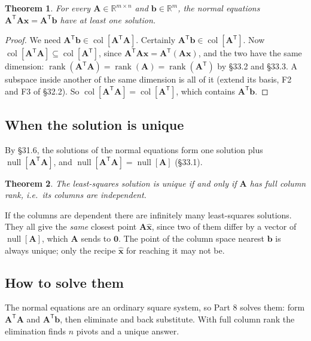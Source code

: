 \documentclass[11pt]{article}
\theoremstyle{plain}
\newtheorem{thm}{Theorem}[section]
\theoremstyle{definition}
\theoremstyle{remark}
\newcommand{\R}{\mathbb{R}}
\newcommand{\vc}[1]{\mathbf{#1}}
\newcommand{\mt}[1]{\mathbf{#1}}
\newcommand{\T}{^{\mathsf{T}}}
\newcommand{\colsp}[1]{\operatorname{col}[#1]}
\newcommand{\nullsp}[1]{\operatorname{null}[#1]}
\newcommand{\xh}{\hat{\vc{x}}}
\DeclareMathOperator{\rank}{rank}
\begin{document}
\begin{thm}
\label{thm:consistent}
For every $\mt{A}\in\R^{m\times n}$ and $\vc{b}\in\R^{m}$, the normal equations
$\mt{A}\T\mt{A}\vc{x}=\mt{A}\T\vc{b}$ have at least one solution.
\end{thm}

\begin{proof}
We need $\mt{A}\T\vc{b}\in\colsp{\mt{A}\T\mt{A}}$. Certainly
$\mt{A}\T\vc{b}\in\colsp{\mt{A}\T}$. Now
$\colsp{\mt{A}\T\mt{A}}\subseteq\colsp{\mt{A}\T}$, since
$\mt{A}\T\mt{A}\vc{x}=\mt{A}\T(\mt{A}\vc{x})$, and the two have the same
dimension: $\rank(\mt{A}\T\mt{A})=\rank(\mt{A})=\rank(\mt{A}\T)$ by \S33.2 and
\S33.3. A subspace inside another of the same dimension is all of it (extend its
basis, F2 and F3 of \S32.2). So $\colsp{\mt{A}\T\mt{A}}=\colsp{\mt{A}\T}$, which
contains $\mt{A}\T\vc{b}$.
\end{proof}

\subsection{When the solution is unique}
By \S31.6, the solutions of the normal equations form one solution plus
$\nullsp{\mt{A}\T\mt{A}}$, and $\nullsp{\mt{A}\T\mt{A}}=\nullsp{\mt{A}}$ (\S33.1).

\begin{thm}
\label{thm:unique}
The least-squares solution is unique if and only if $\mt{A}$ has full column
rank, i.e.\ its columns are independent.
\end{thm}

\noindent If the columns are dependent there are infinitely many least-squares
solutions. They all give the \emph{same} closest point $\mt{A}\xh$, since two of
them differ by a vector of $\nullsp{\mt{A}}$, which $\mt{A}$ sends to $\vc{0}$.
The point of the column space nearest $\vc{b}$ is always unique; only the recipe
$\xh$ for reaching it may not be.

\subsection{How to solve them}
The normal equations are an ordinary square system, so Part 8 solves them: form
$\mt{A}\T\mt{A}$ and $\mt{A}\T\vc{b}$, then eliminate and back substitute. With
full column rank the elimination finds $n$ pivots and a unique answer.
\end{document}
